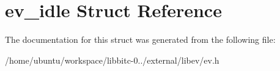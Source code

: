 \hypertarget{structev__idle}{\section{ev\-\_\-idle Struct Reference}
\label{structev__idle}
}


The documentation for this struct was generated from the following file\-:\begin{DoxyCompactItemize}
\item 
/home/ubuntu/workspace/libbitc-\/0../external/libev/ev.\-h\end{DoxyCompactItemize}
